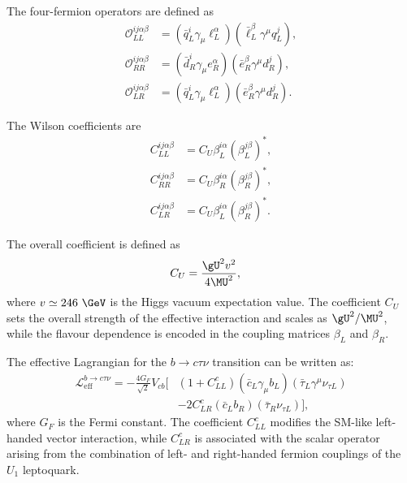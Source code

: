 The four-fermion operators are defined as
\begin{align}
\mathcal{O}_{LL}^{ij\alpha\beta}
&=
\left(
\bar{q}_{L}^{i}\gamma_{\mu}\ell_{L}^{\alpha}
\right)
\left(
\bar{\ell}_{L}^{\beta}\gamma^{\mu}q_{L}^{j}
\right),
\\
\mathcal{O}_{RR}^{ij\alpha\beta}
&=
\left(
\bar{d}_{R}^{i}\gamma_{\mu}e_{R}^{\alpha}
\right)
\left(
\bar{e}_{R}^{\beta}\gamma^{\mu}d_{R}^{j}
\right),
\\
\mathcal{O}_{LR}^{ij\alpha\beta}
&=
\left(
\bar{q}_{L}^{i}\gamma_{\mu}\ell_{L}^{\alpha}
\right)
\left(
\bar{e}_{R}^{\beta}\gamma^{\mu}d_{R}^{j}
\right).
\end{align}

The Wilson coefficients are
\begin{align}
C_{LL}^{ij\alpha\beta}
&=
C_{U}\beta_{L}^{i\alpha}
\left(
\beta_{L}^{j\beta}
\right)^{*},
\\
C_{RR}^{ij\alpha\beta}
&=
C_{U}\beta_{R}^{i\alpha}
\left(
\beta_{R}^{j\beta}
\right)^{*},
\\
C_{LR}^{ij\alpha\beta}
&=
C_{U}\beta_{L}^{i\alpha}
\left(
\beta_{R}^{j\beta}
\right)^{*}.
\end{align}

The overall coefficient is defined as
\begin{align}
C_{U}
&=
\frac{\gU^{2}v^{2}}{4\MU^{2}},
\label{eq:cu_definition}
\end{align}
where $v\simeq246~\GeV$ is the Higgs vacuum expectation value.
The coefficient $C_{U}$ sets the overall strength of the effective interaction and scales as $\gU^{2}/\MU^{2}$, while the flavour dependence is encoded in the coupling matrices $\beta_{L}$ and $\beta_{R}$.

The effective Lagrangian for the $b\to c\tau\nu$ transition can be written as:
\begin{align}
    \mathcal{L}_{\mathrm{eff}}^{b\rightarrow c\tau\nu}
    =
    -\frac{4G_{F}}{\sqrt{2}}V_{cb}
    \bigg[
        &
        \left(
            1+C_{LL}^{c}
        \right)
        \left(
            \bar{c}_{L}\gamma_{\mu}b_{L}
        \right)
        \left(
            \bar{\tau}_{L}\gamma^{\mu}\nu_{\tau L}
        \right)
        \nonumber\\
        &
        -
        2C_{LR}^{c}
        \left(
            \bar{c}_{L}b_{R}
        \right)
        \left(
            \bar{\tau}_{R}\nu_{\tau L}
        \right)
    \bigg],
    \label{eq:bctaunu_effective_lagrangian}
\end{align}
where $G_{F}$ is the Fermi constant.
The coefficient $C_{LL}^{c}$ modifies the SM-like left-handed vector
interaction, while $C_{LR}^{c}$ is associated with the scalar operator
arising from the combination of left- and right-handed fermion couplings
of the $U_{1}$ leptoquark.

